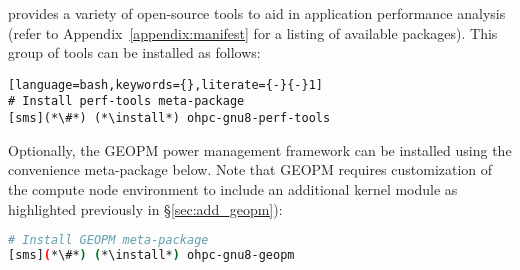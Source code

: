 \OHPC{} provides a variety of open-source tools to aid in application 
performance analysis (refer to Appendix~\ref{appendix:manifest} for a listing
of available packages). This group of tools can be installed as follows:

\begin{lstlisting}[language=bash,keywords={},literate={-}{-}1]
# Install perf-tools meta-package
[sms](*\#*) (*\install*) ohpc-gnu8-perf-tools
\end{lstlisting}

\noindent Optionally, the GEOPM power management framework can be installed
using the convenience meta-package below. Note that GEOPM
requires customization of the compute node environment to include an additional
kernel module as highlighted previously in \S\ref{sec:add_geopm}):

\begin{lstlisting}[language=bash,keywords={},upquote=true]
# Install GEOPM meta-package
[sms](*\#*) (*\install*) ohpc-gnu8-geopm

\end{lstlisting}
